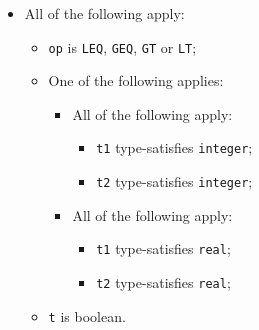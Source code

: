 \documentclass{book}
\begin{document}
\begin{itemize}
  \item All of the following apply:
    \begin{itemize}
    \item \texttt{op} is \texttt{LEQ}, \texttt{GEQ}, \texttt{GT} or \texttt{LT};
    \item One of the following applies:
      \begin{itemize}
      \item All of the following apply:
        \begin{itemize}
        \item \texttt{t1} type-satisfies \texttt{integer};
        \item \texttt{t2} type-satisfies \texttt{integer};
        \end{itemize}
      \item All of the following apply:
        \begin{itemize}
        \item \texttt{t1} type-satisfies \texttt{real};
        \item \texttt{t2} type-satisfies \texttt{real};
        \end{itemize}
      \end{itemize}
    \item \texttt{t} is boolean.
    \end{itemize}


\end{itemize}
\end{document}
